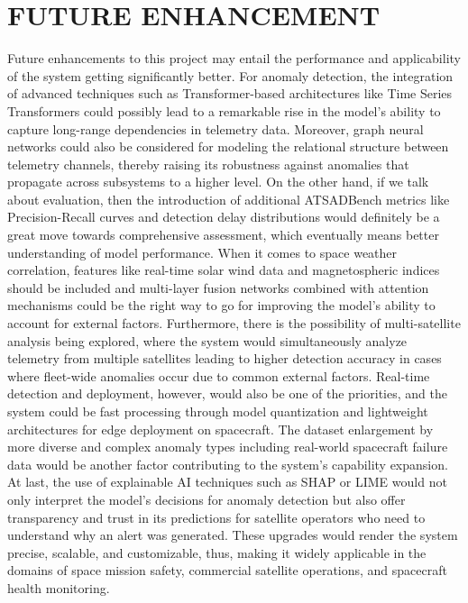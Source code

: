\documentclass[conference]{IEEEtran}
\begin{document}
\section{FUTURE ENHANCEMENT}

Future enhancements to this project may entail the performance and applicability of the system getting significantly better. For anomaly detection, the integration of advanced techniques such as Transformer-based architectures like Time Series Transformers could possibly lead to a remarkable rise in the model's ability to capture long-range dependencies in telemetry data. Moreover, graph neural networks could also be considered for modeling the relational structure between telemetry channels, thereby raising its robustness against anomalies that propagate across subsystems to a higher level. On the other hand, if we talk about evaluation, then the introduction of additional ATSADBench metrics like Precision-Recall curves and detection delay distributions would definitely be a great move towards comprehensive assessment, which eventually means better understanding of model performance. When it comes to space weather correlation, features like real-time solar wind data and magnetospheric indices should be included and multi-layer fusion networks combined with attention mechanisms could be the right way to go for improving the model's ability to account for external factors. Furthermore, there is the possibility of multi-satellite analysis being explored, where the system would simultaneously analyze telemetry from multiple satellites leading to higher detection accuracy in cases where fleet-wide anomalies occur due to common external factors. Real-time detection and deployment, however, would also be one of the priorities, and the system could be fast processing through model quantization and lightweight architectures for edge deployment on spacecraft. The dataset enlargement by more diverse and complex anomaly types including real-world spacecraft failure data would be another factor contributing to the system's capability expansion. At last, the use of explainable AI techniques such as SHAP or LIME would not only interpret the model's decisions for anomaly detection but also offer transparency and trust in its predictions for satellite operators who need to understand why an alert was generated. These upgrades would render the system precise, scalable, and customizable, thus, making it widely applicable in the domains of space mission safety, commercial satellite operations, and spacecraft health monitoring.
\end{document}
